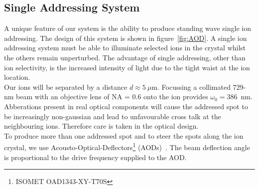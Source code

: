 \subsection{Single Addressing System}
\label{sec:Single Addressing System}
    A unique feature of our system is the ability to produce standing wave
    single ion addressing. The design of this system is shown in
    figure~\ref{fig:AOD}.  A single ion addressing system must be able to
    illuminate selected ions in the crystal whilst the others remain
    unperturbed. The advantage of single addressing, other than ion selectivity,
    is the increased intensity of light due to the tight waist at the ion
    location. \\
    Our ions will be separated by a distance $d\approx 5~\mu$m.  Focussing a
    collimated 729-nm beam with an objective lens of NA = 0.6 onto the ion
    provides $\omega_0 = 386$~nm.  Abberations present in real optical
    components will cause the addressed spot to be increasingly non-gaussian and
    lead to unfavourable cross talk at the neighbouring ions. Therefore care is
    taken in the optical design.\\
    To produce more than one addressed spot and to steer the spots along the ion
    crystal, we use Acousto-Optical-Deflectors\footnote{ISOMET OAD1343-XY-T70S}
    (AODs)~\cite{nagourney_quantum_2014, li_low-crosstalk_2023,
    pogorelov_compact_2021}. The beam deflection angle is proportional to the
    drive frequency supplied to the AOD. \\